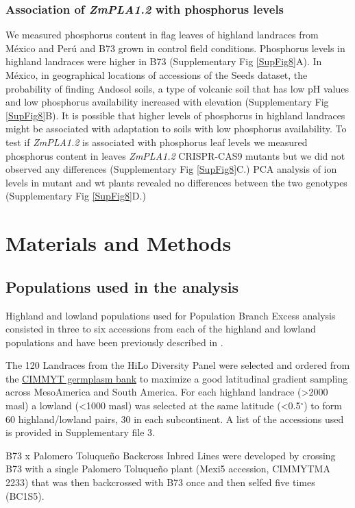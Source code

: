 \documentclass[9pt,twocolumn,twoside]{BioRxiv}
\begin{document}
\subsubsection{Association of \textit{ZmPLA1.2} with phosphorus levels}
We measured phosphorus content in flag leaves of highland landraces from México and Perú and B73 grown in control field conditions. Phosphorus levels in highland landraces were higher in B73 (Supplementary Fig \ref{SupFig8}A). 
In México, in geographical locations of accessions of the Seeds dataset, the probability of finding Andosol soils, a type of volcanic soil that has low pH values and low phosphorus availability increased with elevation (Supplementary Fig \ref{SupFig8}B).
It is possible that higher levels of phosphorus in highland landraces might be associated with adaptation to soils with low phosphorus availability. 
To test if \textit{ZmPLA1.2} is associated with phosphorus leaf levels we measured phosphorus content in leaves \textit{ZmPLA1.2} CRISPR-CAS9 mutants but we did not observed any differences (Supplementary Fig \ref{SupFig8}C.) 
PCA analysis of ion levels in mutant and wt plants revealed no differences between the two genotypes (Supplementary Fig \ref{SupFig8}D.) 
\section{Materials and Methods}
\label{sec:materials:methods}
\subsection{Populations used in the analysis } 
Highland and lowland populations used for Population Branch Excess analysis consisted in three to six accessions from each of the highland and lowland populations and have been previously described in \cite{Wang2020-mp, Wang2017-bc}. 

The 120 Landraces from the HiLo Diversity Panel were selected and ordered from the \href{http://mgb.cimmyt.org/gringlobal/search.aspx}{CIMMYT germplasm bank} to maximize a good latitudinal gradient sampling across MesoAmerica and South America. For each highland landrace (>2000 masl) a lowland (<1000 masl) was selected at the same latitude (<0.5$^{\circ}$) to form 60 highland/lowland pairs, 30 in each subcontinent. A list of the accessions used is provided in Supplementary file 3.   

B73 x Palomero Toluqueño Backcross Inbred Lines were developed by crossing B73 with a single Palomero Toluqueño plant (Mexi5 accession, CIMMYTMA 2233) that was then backcrossed with B73 once and then selfed five times (BC1S5).  
\end{document}
